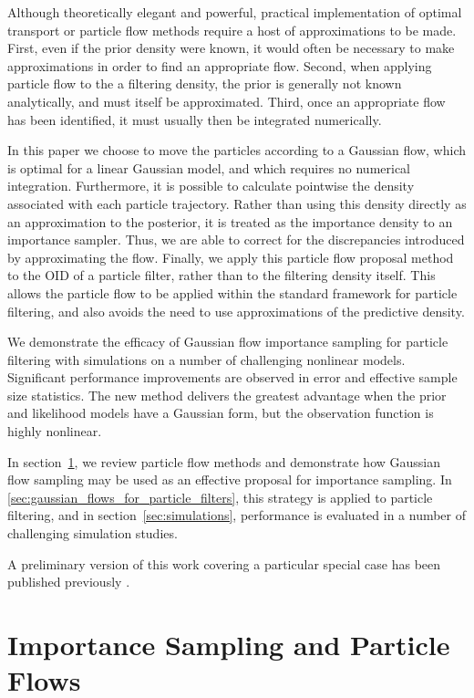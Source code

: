 \documentclass{article}
\begin{document}
Although theoretically elegant and powerful, practical implementation of optimal transport or particle flow methods require a host of approximations to be made. First, even if the prior density were known, it would often be necessary to make approximations in order to find an appropriate flow. Second, when applying particle flow to the a filtering density, the prior is generally not known analytically, and must itself be approximated. Third, once an appropriate flow has been identified, it must usually then be integrated numerically.

In this paper we choose to move the particles according to a Gaussian flow, which is optimal for a linear Gaussian model, and which requires no numerical integration. Furthermore, it is possible to calculate pointwise the density associated with each particle trajectory. Rather than using this density directly as an approximation to the posterior, it is treated as the importance density to an importance sampler. Thus, we are able to correct for the discrepancies introduced by approximating the flow. Finally, we apply this particle flow proposal method to the OID of a particle filter, rather than to the filtering density itself. This allows the particle flow to be applied within the standard framework for particle filtering, and also avoids the need to use approximations of the predictive density.

We demonstrate the efficacy of Gaussian flow importance sampling for particle filtering with simulations on a number of challenging nonlinear models. Significant performance improvements are observed in error and effective sample size statistics. The new method delivers the greatest advantage when the prior and likelihood models have a Gaussian form, but the observation function is highly nonlinear.

In section~\ref{sec:gaussian_flows}, we review particle flow methods and demonstrate how Gaussian flow sampling may be used as an effective proposal for importance sampling. In \ref{sec:gaussian_flows_for_particle_filters}, this strategy is applied to particle filtering, and in section~\ref{sec:simulations}, performance is evaluated in a number of challenging simulation studies.

A preliminary version of this work covering a particular special case has been published previously \cite{Bunch2013a}.


\section{Importance Sampling and Particle Flows} \label{sec:gaussian_flows}
\end{document}
